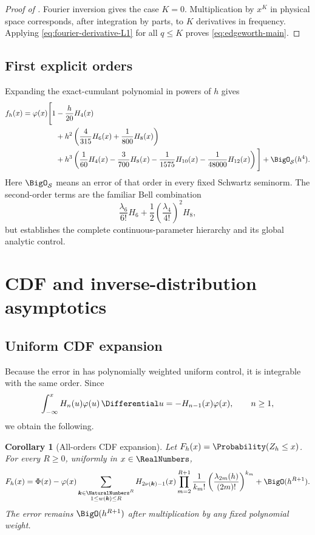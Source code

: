 \documentclass[11pt]{article}
\numberwithin{equation}{section}
\newtheorem{corollary}[theorem]{Corollary}
\theoremstyle{definition}
\newcommand{\phiN}{\varphi}
\newcommand{\PhiN}{\Phi}
\begin{document}
\begin{proof}[Proof of ]
Fourier inversion gives the case \(K=0\).  Multiplication by \(x^K\) in physical space corresponds, after integration by parts, to \(K\) derivatives in frequency.  Applying \eqref{eq:fourier-derivative-L1} for all \(q\le K\) proves \eqref{eq:edgeworth-main}.
\end{proof}

\subsection{First explicit orders}
Expanding the exact-cumulant polynomial in powers of \(h\) gives
\begin{align}
 f_h(x)=\phiN(x)\Bigg[1
 &-\frac{h}{20}H_4(x)\notag\\
 &+h^2\left(\frac4{315}H_6(x)+\frac1{800}H_8(x)\right)\notag\\
 &+h^3\left(\frac1{60}H_4(x)-\frac3{700}H_8(x)
 -\frac1{1575}H_{10}(x)-\frac1{48000}H_{12}(x)\right)
 \Bigg]+\BigO_{\mathcal S}(h^4).\label{eq:edgeworth-three-orders}
\end{align}
Here \(\BigO_{\mathcal S}\) means an error of that order in every fixed Schwartz seminorm.  The second-order terms are the familiar Bell combination
\[
 \frac{\lambda_6}{6!}H_6+\frac12\left(\frac{\lambda_4}{4!}\right)^2H_8,
\]
but  establishes the complete continuous-parameter hierarchy and its global analytic control.

\section{CDF and inverse-distribution asymptotics}\label{sec:quantiles}

\subsection{Uniform CDF expansion}
Because the error in  has polynomially weighted uniform control, it is integrable with the same order.  Since
\begin{equation}\label{eq:integrate-hermite}
 \int_{-\infty}^xH_n(u)\phiN(u)\,\Differential u=-H_{n-1}(x)\phiN(x),\qquad n\ge1,
\end{equation}
we obtain the following.

\begin{corollary}[All-orders CDF expansion]\label{cor:cdf-edgeworth}
Let \(F_h(x)=\Probability(Z_h\le x)\).  For every \(R\ge0\), uniformly in \(x\in\RealNumbers\),
\begin{equation}\label{eq:cdf-general}
 F_h(x)=\PhiN(x)-\phiN(x)
 \sum_{\substack{\bm k\in\NaturalNumbers^R\\1\le w(\bm k)\le R}}
 H_{2\nu(\bm k)-1}(x)
 \prod_{m=2}^{R+1}\frac1{k_m!}
 \left(\frac{\lambda_{2m}(h)}{(2m)!}\right)^{k_m}
 +\BigO(h^{R+1}).
\end{equation}
The error remains \(\BigO(h^{R+1})\) after multiplication by any fixed polynomial weight.
\end{corollary}
\end{document}
